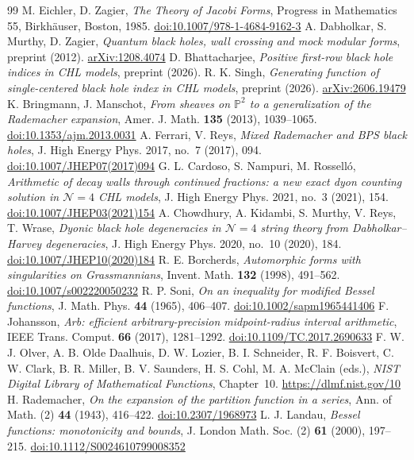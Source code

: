 \documentclass[11pt]{amsart}
\numberwithin{equation}{section}
\theoremstyle{plain}
\theoremstyle{definition}
\theoremstyle{remark}
\begin{document}
\begin{thebibliography}{99}
 M. Eichler, D. Zagier, \emph{The Theory of Jacobi Forms}, Progress in Mathematics 55, Birkh\"auser, Boston, 1985. \href{https://doi.org/10.1007/978-1-4684-9162-3}{doi:10.1007/978-1-4684-9162-3}
 A. Dabholkar, S. Murthy, D. Zagier, \emph{Quantum black holes, wall crossing and mock modular forms}, preprint (2012). \href{https://arxiv.org/abs/1208.4074}{arXiv:1208.4074}
 D. Bhattacharjee, \emph{Positive first-row black hole indices in CHL models}, preprint (2026).
 R. K. Singh, \emph{Generating function of single-centered black hole index in CHL models}, preprint (2026). \href{https://arxiv.org/abs/2606.19479}{arXiv:2606.19479}
 K. Bringmann, J. Manschot, \emph{From sheaves on $\mathbb P^2$ to a generalization of the Rademacher expansion}, Amer. J. Math. \textbf{135} (2013), 1039--1065. \href{https://doi.org/10.1353/ajm.2013.0031}{doi:10.1353/ajm.2013.0031}
 A. Ferrari, V. Reys, \emph{Mixed Rademacher and BPS black holes}, J. High Energy Phys. 2017, no.~7 (2017), 094. \href{https://doi.org/10.1007/JHEP07(2017)094}{doi:10.1007/JHEP07(2017)094}
 G. L. Cardoso, S. Nampuri, M. Rossell\'o, \emph{Arithmetic of decay walls through continued fractions: a new exact dyon counting solution in $\mathcal N=4$ CHL models}, J. High Energy Phys. 2021, no.~3 (2021), 154. \href{https://doi.org/10.1007/JHEP03(2021)154}{doi:10.1007/JHEP03(2021)154}
 A. Chowdhury, A. Kidambi, S. Murthy, V. Reys, T. Wrase, \emph{Dyonic black hole degeneracies in $\mathcal N=4$ string theory from Dabholkar--Harvey degeneracies}, J. High Energy Phys. 2020, no.~10 (2020), 184. \href{https://doi.org/10.1007/JHEP10(2020)184}{doi:10.1007/JHEP10(2020)184}
 R. E. Borcherds, \emph{Automorphic forms with singularities on Grassmannians}, Invent. Math. \textbf{132} (1998), 491--562. \href{https://doi.org/10.1007/s002220050232}{doi:10.1007/s002220050232}
 R. P. Soni, \emph{On an inequality for modified Bessel functions}, J. Math. Phys. \textbf{44} (1965), 406--407. \href{https://doi.org/10.1002/sapm1965441406}{doi:10.1002/sapm1965441406}
 F. Johansson, \emph{Arb: efficient arbitrary-precision midpoint-radius interval arithmetic}, IEEE Trans. Comput. \textbf{66} (2017), 1281--1292. \href{https://doi.org/10.1109/TC.2017.2690633}{doi:10.1109/TC.2017.2690633}
 F. W. J. Olver, A. B. Olde Daalhuis, D. W. Lozier, B. I. Schneider, R. F. Boisvert, C. W. Clark, B. R. Miller, B. V. Saunders, H. S. Cohl, M. A. McClain (eds.), \emph{NIST Digital Library of Mathematical Functions}, Chapter~10. \url{https://dlmf.nist.gov/10}
 H. Rademacher, \emph{On the expansion of the partition function in a series}, Ann. of Math. (2) \textbf{44} (1943), 416--422. \href{https://doi.org/10.2307/1968973}{doi:10.2307/1968973}
 L. J. Landau, \emph{Bessel functions: monotonicity and bounds}, J. London Math. Soc. (2) \textbf{61} (2000), 197--215. \href{https://doi.org/10.1112/S0024610799008352}{doi:10.1112/S0024610799008352}
\end{thebibliography}
\end{document}
